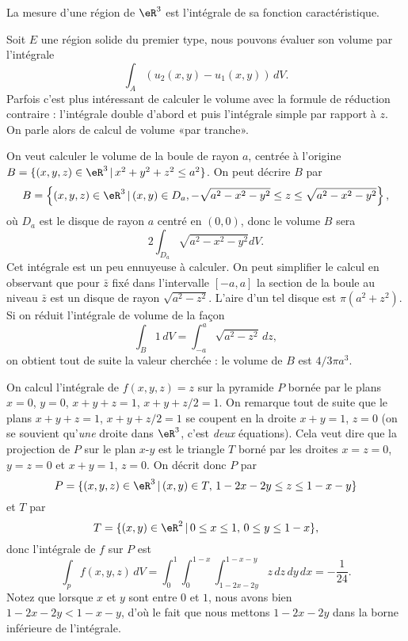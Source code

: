 \begin{definition}
   La mesure d'une région de  $\eR^3$ est l'intégrale de sa fonction caractéristique. 
\end{definition}
Soit $E$ une région solide du premier type, nous pouvons évaluer son volume par l'intégrale
\[
\int_A\left(u_2(x,y)-u_1(x,y)\right)\, dV.
\]  
Parfois c'est plus intéressant de calculer le volume avec la formule de réduction contraire : l'intégrale double d'abord et puis l'intégrale simple par rapport à $z$. On parle alors de calcul de volume «par tranche».

\begin{example}
On veut calculer le volume de la boule de rayon $a$, centrée à l'origine $B=\{(x,y,z)\in\eR^3\,\vert\, x^2+y^2+z^2\leq a^2 \}$. On peut décrire $B$ par
\[
  B=\left\{(x,y,z)\in\eR^3\,\vert\, (x,y)\in D_a, -\sqrt{a^2-x^2-y^2}\leq z\leq \sqrt{a^2-x^2-y^2}  \right\},
\]
où $D_a$ est le disque de rayon $a$ centré en $(0,0)$, donc le volume $B$ sera
\[
2 \int_{D_a}\sqrt{a^2-x^2-y^2} dV.
\] 
Cet intégrale est un peu ennuyeuse à calculer. On peut simplifier le calcul en observant que pour $\bar z$ fixé dans l'intervalle $[-a,a]$ la section de la boule au niveau $\bar z$ est un disque de rayon $\sqrt{a^2-z^2}$. L'aire d'un tel disque est  $\pi (a^2+z^2)$. Si on réduit l'intégrale de volume de la façon
\[
\int_{B} 1\, dV=\int_{-a}^{a}  \sqrt{a^2-z^2}\, dz,
\] 
on obtient tout de suite la valeur cherchée : le volume de $B$ est $4/3 \pi a^3$.   
\end{example}
\begin{example}
	On calcul l'intégrale de $f(x,y,z)=z$ sur la pyramide $P$ bornée par le plans $x=0$, $y=0$, $x+y+z=1$, $x+y+z/2=1$. On remarque tout de suite que le plans $x+y+z=1$, $x+y+z/2=1$ se coupent en la droite $x+y=1$, $z=0$ (on se souvient qu'\emph{une} droite dans $\eR^3$, c'est \emph{deux} équations). Cela veut dire que la projection de $P$ sur le plan $x$-$y$ est le  triangle $T$ borné par les droites $x=z=0$, $y=z=0$ et $x+y=1$, $z=0$.  
On  décrit donc $P$ par
\[
P=\{(x,y,z)\in\eR^3\,\vert\, (x,y)\in T, \, 1-2x-2y\leq z\leq 1-x-y\}
\] 
et $T$ par 
\[
T=\{(x,y)\in\eR^2\,\vert\, 0\leq x\leq 1,\,  0\leq y\leq 1-x\},
\]
donc l'intégrale de $f$ sur $P$ est 
\[
\int_pf(x,y,z)\, dV= \int_{0}^{1}\int_{0}^{1-x}\int_{1-2x-2y}^{1-x-y}z \,dz\,dy\,dx=-\frac{1}{ 24 }.
\]
Notez que lorsque $x$ et $y$ sont entre $0$ et $1$, nous avons bien $1-2x-2y<1-x-y$, d'où le fait que nous mettons $1-2x-2y$ dans la borne inférieure de l'intégrale.
\end{example}

